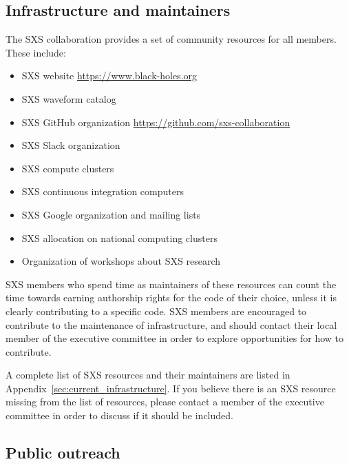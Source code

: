 \documentclass[12pt]{article}
\begin{document}
\subsection{Infrastructure and maintainers}\label{sec:infrastructure}
The SXS collaboration provides a set of community resources for all
members.  These include:
\begin{itemize}
  \setlength\itemsep{-0.25em}
\item SXS website \url{https://www.black-holes.org}
\item SXS waveform catalog
\item SXS GitHub organization \url{https://github.com/sxs-collaboration}
\item SXS Slack organization
\item SXS compute clusters
\item SXS continuous integration computers
\item SXS Google organization and mailing lists
\item SXS allocation on national computing clusters
\item Organization of workshops about SXS research
\end{itemize}

SXS members who spend time as maintainers of these resources can count
the time towards earning authorship rights for the code of their
choice, unless it is clearly contributing to a specific code.  SXS
members are encouraged to contribute to the maintenance of
infrastructure, and should contact their local member of the executive
committee in order to explore opportunities for how to contribute.

A complete list of SXS resources and their maintainers are listed in
Appendix~\ref{sec:current_infrastructure}.  If you believe there is an
SXS resource missing from the list of resources, please contact a
member of the executive committee in order to discuss if it should be
included.

\subsection{Public outreach\label{sec:public outreach}}
\end{document}
